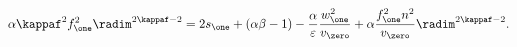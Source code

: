 \begin{equation}
\alpha \kappaf^2 f_\one^2 \radim^{2 \kappaf-2}=2 s_\one +\left(\alpha
\beta -1\right) - \frac{\alpha}{\varepsilon} \frac{w_\one^2}{v_\zero} + 
\alpha \frac{f_\one^2 n^2}{v_\zero} \radim^{2 \kappaf -2}.
\end{equation}

